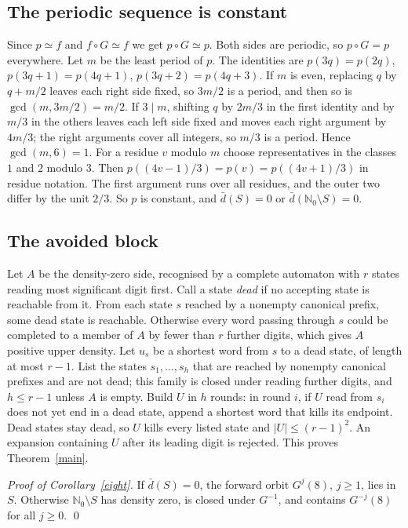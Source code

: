\documentclass[11pt]{article}
\theoremstyle{remark}
\newcommand{\N}{\mathbb{N}_0}
\newcommand{\ud}{\bar d}
\begin{document}
\subsection{The periodic sequence is constant}

Since $p\simeq f$ and $f\circ G\simeq f$ we get $p\circ G\simeq p$. Both sides
are periodic, so $p\circ G=p$ everywhere. Let $m$ be the least period of $p$.
The identities are $p(3q)=p(2q)$, $p(3q+1)=p(4q+1)$, $p(3q+2)=p(4q+3)$. If $m$
is even, replacing $q$ by $q+m/2$ leaves each right side fixed, so $3m/2$ is a
period, and then so is $\gcd(m,3m/2)=m/2$. If $3\mid m$, shifting $q$ by $2m/3$
in the first identity and by $m/3$ in the others leaves each left side fixed
and moves each right argument by $4m/3$; the right arguments cover all
integers, so $m/3$ is a period. Hence $\gcd(m,6)=1$. For a residue $v$ modulo
$m$ choose representatives in the classes $1$ and $2$ modulo $3$. Then
$p((4v-1)/3)=p(v)=p((4v+1)/3)$ in residue notation. The first argument runs
over all residues, and the outer two differ by the unit $2/3$. So $p$ is
constant, and $\ud(S)=0$ or $\ud(\N\setminus S)=0$.

\subsection{The avoided block}

Let $A$ be the density-zero side, recognised by a complete automaton with $r$
states reading most significant digit first. Call a state \emph{dead} if no
accepting state is reachable from it. From each state $s$ reached by a nonempty
canonical prefix, some dead state is reachable. Otherwise every word passing
through $s$ could be completed to a member of $A$ by fewer than $r$ further
digits, which gives $A$ positive upper density. Let $u_s$ be a shortest word
from $s$ to a dead state, of length at most $r-1$. List the states
$s_1,\dots,s_h$ that are reached by nonempty canonical prefixes and are not
dead; this family is closed under reading further digits, and $h\le r-1$ unless
$A$ is empty. Build $U$ in $h$ rounds: in round $i$, if $U$ read
from $s_i$ does not yet end in a dead state, append a shortest word that kills
its endpoint. Dead states stay dead, so $U$ kills every listed state and
$|U|\le(r-1)^2$. An expansion containing $U$ after its leading digit is
rejected. This proves Theorem~\ref{main}.

\medskip
\noindent\emph{Proof of Corollary~\ref{eight}.} If $\ud(S)=0$, the forward orbit
$G^j(8)$, $j\ge1$, lies in $S$. Otherwise $\N\setminus S$ has density zero, is
closed under $G^{-1}$, and contains $G^{-j}(8)$ for all $j\ge0$. \qed
\end{document}
